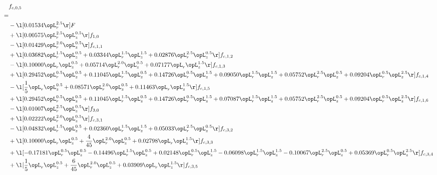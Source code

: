 \begin{alignat}{2} 
\label{eq:f_05_2} 
& f_{c,0,5} \nonumber \\ 
 = \\ 
& - \l[  0.01534 \opL_r^{2.5}  \r] F \nonumber \\ 
& + \l[  0.00575 \opL_r^{2.5} \opL_z^{0.5}  \r] f_{1,0} \nonumber \\ 
& - \l[  0.01429 \opL_r^{2.0} \opL_z^{0.5}  \r] f_{c,1,1} \nonumber \\ 
& + \l[  0.03682 \opL_r^{1.5} \opL_z^{0.5} +  0.03344 \opL_r^{1.5} \opL_z^{1.5} +  0.02876 \opL_r^{2.5} \opL_z^{0.5}  \r] f_{c,1,2} \nonumber \\ 
& - \l[  0.10000 \opL_r \opL_z^{0.5} +  0.05714 \opL_r^{2.0} \opL_z^{0.5} +  0.07177 \opL_r \opL_z^{1.5}  \r] f_{c,1,3} \nonumber \\ 
& + \l[  0.29452 \opL_r^{0.5} \opL_z^{0.5} +  0.11045 \opL_r^{1.5} \opL_z^{0.5} +  0.14726 \opL_r^{0.5} \opL_z^{1.5} +  0.09050 \opL_r^{1.5} \opL_z^{1.5} +  0.05752 \opL_r^{2.5} \opL_z^{0.5} +  0.09204 \opL_r^{0.5} \opL_z^{2.5}  \r] f_{c,1,4} \nonumber \\ 
& - \l[ \frac{1}{5} \opL_r \opL_z^{0.5} +  0.08571 \opL_r^{2.0} \opL_z^{0.5} +  0.11463 \opL_r \opL_z^{1.5}  \r] f_{c,1,5} \nonumber \\ 
& + \l[  0.29452 \opL_r^{0.5} \opL_z^{0.5} +  0.11045 \opL_r^{1.5} \opL_z^{0.5} +  0.14726 \opL_r^{0.5} \opL_z^{1.5} +  0.07087 \opL_r^{1.5} \opL_z^{1.5} +  0.05752 \opL_r^{2.5} \opL_z^{0.5} +  0.09204 \opL_r^{0.5} \opL_z^{2.5}  \r] f_{c,1,6} \nonumber \\ 
& - \l[  0.01007 \opL_r^{2.5} \opL_z^{0.5}  \r] f_{3,0} \nonumber \\ 
& + \l[  0.02222 \opL_r^{2.0} \opL_z^{0.5}  \r] f_{c,3,1} \nonumber \\ 
& - \l[  0.04832 \opL_r^{1.5} \opL_z^{0.5} +  0.02360 \opL_r^{1.5} \opL_z^{1.5} +  0.05033 \opL_r^{2.5} \opL_z^{0.5}  \r] f_{c,3,2} \nonumber \\ 
& + \l[  0.10000 \opL_r \opL_z^{0.5} + \frac{4}{45} \opL_r^{2.0} \opL_z^{0.5} +  0.02798 \opL_r \opL_z^{1.5}  \r] f_{c,3,3} \nonumber \\ 
& + \l[  -0.17181 \opL_r^{0.5} \opL_z^{0.5}   -0.14496 \opL_r^{1.5} \opL_z^{0.5} +  0.02148 \opL_r^{0.5} \opL_z^{1.5}   -0.06098 \opL_r^{1.5} \opL_z^{1.5}   -0.10067 \opL_r^{2.5} \opL_z^{0.5} +  0.05369 \opL_r^{0.5} \opL_z^{2.5}  \r] f_{c,3,4} \nonumber \\ 
& + \l[ \frac{1}{5} \opL_r \opL_z^{0.5} + \frac{6}{45} \opL_r^{2.0} \opL_z^{0.5} +  0.03909 \opL_r \opL_z^{1.5}  \r] f_{c,3,5} \nonumber \\ 

\end{alignat}
